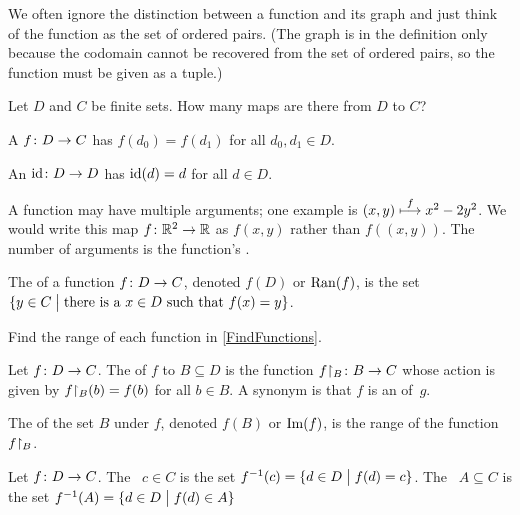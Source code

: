 \documentclass{ibl}
\begin{document}
We often ignore the distinction between a function and its graph
and just
think of the function as the set of ordered pairs.
(The graph is in the definition only 
because the codomain cannot be recovered
from the set of ordered pairs, so the function must be 
given as a tuple.)

\begin{ex}
Let $D$ and $C$ be finite sets.
How many maps are there from $D$ to $C$?
\end{ex}

\begin{df}
A  $\mbox{$f\colon D\to C$}$ has  
$f(d_0)=f(d_1)$ for all $d_0,d_1\in D$.
\end{df}\begin{df}
An  $\mbox{$\operatorname{id}\colon D\to D$}$ has
$\operatorname{id}(d)=d$ for all $d\in D$.
\end{df}

A function may have multiple arguments; one example is 
$(x,y)\stackrel{f}{\longmapsto}x^2-2y^2$.
We would write this map $\mbox{$f\colon \mathbb{R}^2\to \mathbb{R}$}$ as 
$f(x,y)$ rather than
$f((x,y))$.
The number of arguments is the function's .

\begin{df}
The  of a function $\mbox{$f\colon D\to C$}$,
denoted  $f(D)$ or $\operatorname{Ran}(f)$,
is the set
$\{y\in C \bigm| \text{there is a $x\in D$ such that $f(x)=y$}\}$.
\end{df}

\begin{ex}
Find the range of each function in \cref{FindFunctions}.  
\end{ex}

\begin{df}
Let $\mbox{$f\colon D\to C$}$.
The  of $f$ to $B\subseteq D$ is
the function $\mbox{${f}\mathord\upharpoonright_{B}\colon B\to C$}$ whose action is given by 
${f}\mathord\upharpoonright_{B}(b)=f(b)$ for all $b\in B$.
A synonym is that
$f$ is an  of~$g$.

The  of the set $B$ under $f$, 
denoted $f(B)$ or $\operatorname{Im}(f)$,
is the range of the function ${f}\mathord\upharpoonright_{B}$.
\end{df}

\begin{df}
Let $\mbox{$f\colon D\to C$}$.
The ~$c\in C$ is
the set $f^{-1}(c)=\{d\in D \bigm| f(d)=c\}$.
The ~$A\subseteq C$
is the set $f^{-1}(A)=\{d\in D \bigm| f(d)\in A\}$   
\end{df}
\end{document}
